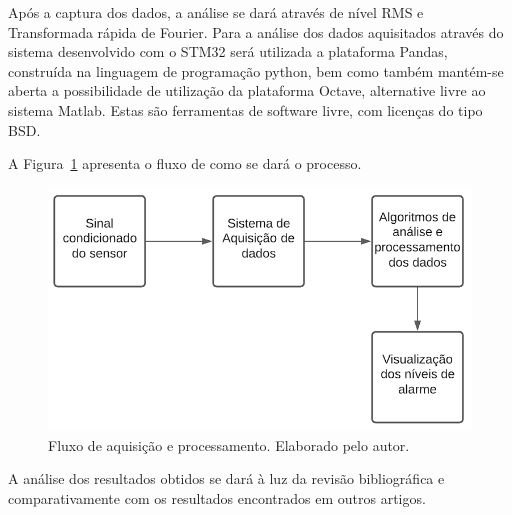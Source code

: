 \documentclass[
	12pt,				
	oneside,			
	a4paper,			
	english,			
	brazil,			
	]{abntex2ppgsi}
\begin{document}
Após a captura dos dados, a análise se dará através de nível RMS e Transformada rápida de Fourier. Para a análise dos dados aquisitados através do sistema desenvolvido com o STM32 será utilizada a plataforma Pandas, construída na linguagem de programação python, bem como também mantém-se aberta a possibilidade de utilização da plataforma Octave, alternative livre ao sistema Matlab. Estas são ferramentas de software livre, com licenças do tipo BSD. 

A Figura~\ref{fluxograma_aquisicao} apresenta o fluxo de como se dará o processo.

\begin{figure}[H]
\centering
\includegraphics[width=\textwidth,height=\textheight,keepaspectratio]{fluxograma_funcionamento_sistema}
\caption {Fluxo de aquisição e processamento. Elaborado pelo autor.}
\label{fluxograma_aquisicao}
\end{figure} 



A análise dos resultados obtidos se dará à luz da revisão bibliográfica e comparativamente com os resultados encontrados em outros artigos. 
\end{document}
